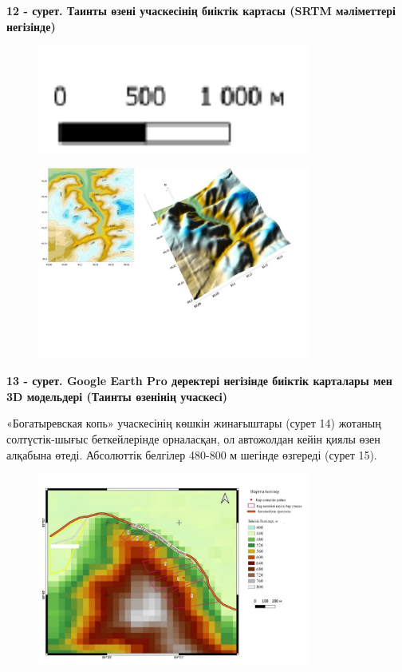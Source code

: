 {\bfseries 12 - сурет. Таинты өзені учаскесінің биіктік картасы (SRTM
мәліметтері негізінде)}


\begin{figure}[H]
	\centering
	\includegraphics[width=0.8\textwidth]{media/ict2/image209}
	\caption*{}
\end{figure}

\begin{figure}[H]
	\centering
	\includegraphics[width=0.8\textwidth]{media/ict2/image216}
	\caption*{}
\end{figure}


{\bfseries 13 - сурет. Google Earth Pro деректері негізінде биіктік
карталары мен 3D модельдері (Таинты өзенінің учаскесі)}

«Богатыревская копь» учаскесінің көшкін жинағыштары (сурет 14) жотаның
солтүстік-шығыс беткейлерінде орналасқан, ол автожолдан кейін қиялы өзен
алқабына өтеді. Абсолюттік белгілер 480-800 м шегінде өзгереді (сурет
15).


\begin{figure}[H]
	\centering
	\includegraphics[width=0.8\textwidth]{media/ict2/image217}
	\caption*{}
\end{figure}


